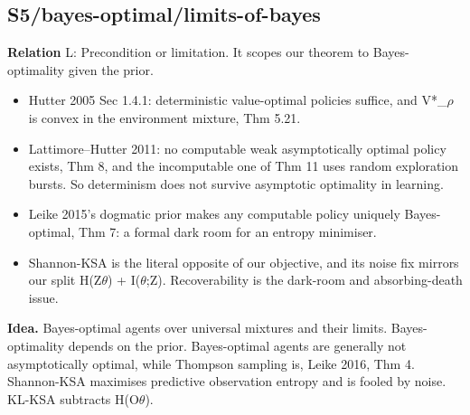 \documentclass[10pt]{article}
\begin{document}
\subsection{S5/bayes-optimal/limits-of-bayes}\label{node:S5-S5-bayes-optimal-limits-of-bayes}
\textbf{Relation} \textsf{L}: Precondition or limitation. It scopes our theorem to Bayes-optimality given the prior.
\begin{itemize}[nosep,leftmargin=1.2em]
\item Hutter 2005 Sec 1.4.1: deterministic value-optimal policies suffice, and V*\_\ensuremath{\rho} is convex in the environment mixture, Thm 5.21.
\item Lattimore--Hutter 2011: no computable weak asymptotically optimal policy exists, Thm 8, and the incomputable one of Thm 11 uses random exploration bursts. So determinism does not survive asymptotic optimality in learning.
\item Leike 2015's dogmatic prior makes any computable policy uniquely Bayes-optimal, Thm 7: a formal dark room for an entropy minimiser.
\item Shannon-KSA is the literal opposite of our objective, and its noise fix mirrors our split H(Z\textbar{}\ensuremath{\theta}) + I(\ensuremath{\theta};Z). Recoverability is the dark-room and absorbing-death issue.
\end{itemize}


\textbf{Idea.} Bayes-optimal agents over universal mixtures and their limits. Bayes-optimality depends on the prior. Bayes-optimal agents are generally not asymptotically optimal, while Thompson sampling is, Leike 2016, Thm 4. Shannon-KSA maximises predictive observation entropy and is fooled by noise. KL-KSA subtracts H(O\textbar{}\ensuremath{\theta}).
\end{document}
